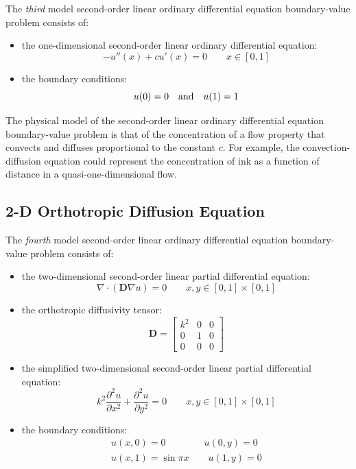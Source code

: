 \documentclass[10pt]{article}		%
\numberwithin{equation}{section}
\newcommand{\psder}[2]{\dfrac{\partial^2#1}{\partial#2^2}}		%
\begin{document}
The \textit{third} model second-order linear ordinary differential equation boundary-value problem consists of:
\begin{itemize}
	\item the one-dimensional second-order linear ordinary differential equation:
	\begin{equation}
	- u''(x)+cu'(x)=0 \qquad x \in [0, 1]
	\end{equation}
	\item the boundary conditions:
	\begin{equation}
	u(0) = 0 \quad \textnormal{and} \quad u(1) = 1 
	\end{equation}
\end{itemize}
The physical model of the second-order linear ordinary differential equation boundary-value problem is that of the concentration of a flow property that convects and diffuses proportional to the constant $c$. For example, the convection-diffusion equation could represent the concentration of ink as a function of distance in a quasi-one-dimensional flow.

\subsection{2-D Orthotropic Diffusion Equation}

The \textit{fourth} model second-order linear ordinary differential equation boundary-value problem consists of:
\begin{itemize}
	\item the two-dimensional second-order linear partial differential equation:
	\begin{equation}
	\nabla \cdot (\mathbf{D} \nabla u) = 0 \qquad x,y \in [0, 1] \times [0, 1]
	\end{equation}
	\item the orthotropic diffusivity tensor:
	\begin{equation}
	\mathbf{D} = \begin{bmatrix}
	k^2 & 0 & 0 \\
	0 & 1 & 0 \\
	0 & 0 & 0
	\end{bmatrix}
	\end{equation}
	\item the simplified two-dimensional second-order linear partial differential equation:
	\begin{equation}
	k^2\psder{u}{x} + \psder{u}{y} = 0 \qquad x,y \in [0, 1] \times [0, 1]
	\end{equation}
	\item the boundary conditions:
	\begin{equation}
	\begin{split}
	u(x, 0) = 0 \qquad \qquad u(0, y) = 0  \\
	u(x, 1) = \sin{\pi x} \qquad u(1, y) = 0
	\end{split}
	\end{equation}
\end{itemize}
\end{document}
